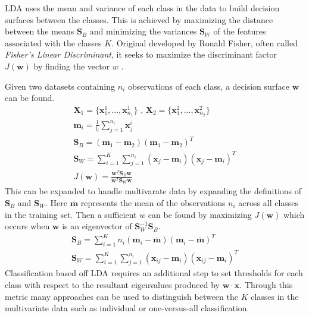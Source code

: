 \ac{LDA} uses the mean and variance of each class in the data to build decision surfaces between the classes. This is achieved by maximizing the distance between the means $\bm{S}_{B}$ and minimizing the variances $\bm{S}_{W}$ of the features associated with the classes $K$. Original developed by Ronald Fisher, often called \textit{Fisher's Linear Discriminant}, it seeks to maximize the discriminant factor $J(\bm{w})$ by finding the vector $\bm{}w$ \cite{Izenman2008}.

Given two datasets containing $n_{i}$ observations of each class, a decision surface $\bm{w}$ can be found.
\begin{gather}
\bm{X}_{1} = \{\bm{x}_{1}^{1},...,\bm{x}^{1}_{n_{1}}\} \text{ , } \bm{X}_{2} = \{\bm{x}_{1}^{2},...,\bm{x}^{2}_{n_{2}}\} \nonumber \\
\bm{m}_{i} = \frac{1}{l_{i}}\sum^{n_{i}}_{j=1}\bm{x}^{i}_{j} \nonumber \\
\bm{S}_{B} = (\bm{m}_{1}-\bm{m}_{2})(\bm{m}_{1}-\bm{m}_{2})^{T} \nonumber \\
\bm{S}_{W} = \sum^{K}_{i=1} \sum^{n_{i}}_{j=1}(\bm{x}_{j}-\bm{m}_{i})(\bm{x}_{j}-\bm{m}_{i})^{T} \nonumber \\
J(\bm{w}) = \frac{\bm{w}^{T}\bm{S}_{B}\bm{w}}{\bm{w}^{T}\bm{S}_{W}\bm{w}}
\end{gather}
This can be expanded to handle multivarate data by expanding the definitions of $\bm{S}_{B}$ and $\bm{S}_{W}$. Here $\bar{\bm{m}}$ represents the mean of the observations $n_{i}$ across all classes in the training set. Then a sufficient $w$ can be found by maximizing $J(\bm{w})$ which occurs when $\bm{w}$ is an eigenvector of $\bm{S}_{W}^{-1}\bm{S}_{B}$.
\begin{gather}
\bm{S}_{B} = \sum^{K}_{i=1} n_{i}(\bm{m}_{i}-\bar{\bm{m}})(\bm{m}_{i}-\bar{\bm{m}})^{T} \nonumber \\
\bm{S}_{W} = \sum^{K}_{i=1} \sum^{n_{i}}_{j=1}(\bm{x}_{ij}-\bm{m}_{i})(\bm{x}_{ij}-\bm{m}_{i})^{T} \nonumber
\end{gather}
Classification based off \ac{LDA} requires an additional step to set thresholds for each class with respect to the resultant eigenvalues produced by $\bm{w}\cdot \bm{x}$. Through this metric many approaches can be used to distinguish between the $K$ classes in the multivariate data such as individual or one-versus-all classification.

